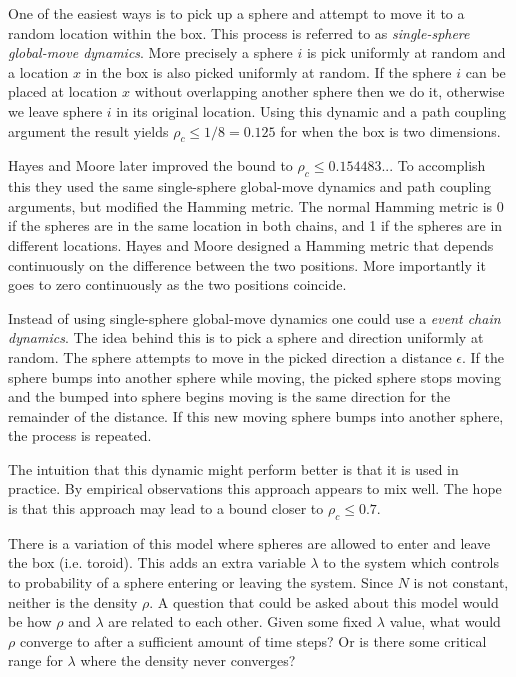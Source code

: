 \documentclass[a4paper,11pt]{article}
\begin{document}
One of the easiest ways is to pick up a sphere and attempt to move it to a random location within the box.  This process is referred to as \textit{single-sphere global-move dynamics}.  More precisely a sphere $i$ is pick uniformly at random and a location $x$ in the box is also picked uniformly at random.  If the sphere $i$ can be placed at location $x$ without overlapping another sphere then we do it, otherwise we leave sphere $i$ in its original location.  Using this dynamic and a path coupling argument the result yields $\rho_c \le 1/8 = 0.125$ \cite{Kannan} for when the box is two dimensions.

Hayes and Moore \cite{Hayes} later improved the bound to $\rho_c \le 0.154483..$.  To accomplish this they used the same single-sphere global-move dynamics and path coupling arguments, but modified the Hamming metric.  The normal Hamming metric is 0 if the spheres are in the same location in both chains, and 1 if the spheres are in different locations.  Hayes and Moore designed a Hamming metric that depends continuously on the difference between the two positions.  More importantly it goes to zero continuously as the two positions coincide.

Instead of using single-sphere global-move dynamics one could use a \textit{event chain dynamics}.  The idea behind this is to pick a sphere and direction uniformly at random.  The sphere attempts to move in the picked direction a distance $\epsilon$.  If the sphere bumps into another sphere while moving, the picked sphere stops moving and the bumped into sphere begins moving is the same direction for the remainder of the distance.  If this new moving sphere bumps into another sphere, the process is repeated.

The intuition that this dynamic might perform better is that it is used in practice.  By empirical observations this approach appears to mix well.  The hope is that this approach may lead to a bound closer to $\rho_c \le 0.7$.

There is a variation of this model where spheres are allowed to enter and leave the box (i.e. toroid).  This adds an extra variable $\lambda$ to the system which controls to probability of a sphere entering or leaving the system.  Since $N$ is not constant, neither is the density $\rho$.  A question that could be asked about this model would be how $\rho$ and $\lambda$ are related to each other.  Given some fixed $\lambda$ value, what would $\rho$ converge to after a sufficient amount of time steps? Or is there some critical range for $\lambda$ where the density never converges?
\end{document}
